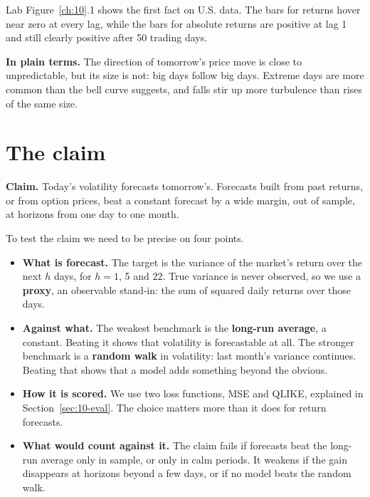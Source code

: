 Lab Figure~\ref{ch:10}.1 shows the first fact on U.S. data. The bars for returns hover near zero at every lag, while the bars for absolute returns are positive at lag 1 and still clearly positive after 50 trading days.

\noindent\textbf{In plain terms.} The direction of tomorrow's price move is close to unpredictable, but its size is not: big days follow big days. Extreme days are more common than the bell curve suggests, and falls stir up more turbulence than rises of the same size.

\section{The claim}
\label{sec:10-claim}

\begin{callout}
\textbf{Claim.} Today's volatility forecasts tomorrow's. Forecasts built from past returns, or from option prices, beat a constant forecast by a wide margin, out of sample, at horizons from one day to one month.
\end{callout}

To test the claim we need to be precise on four points.

\begin{itemize}
  \item \textbf{What is forecast.} The target is the variance of the market's return over the next $h$ days, for $h = 1$, 5 and 22. True variance is never observed, so we use a \textbf{proxy}, an observable stand-in: the sum of squared daily returns over those days.
  \item \textbf{Against what.} The weakest benchmark is the \textbf{long-run average}, a constant. Beating it shows that volatility is forecastable at all. The stronger benchmark is a \textbf{random walk} in volatility: last month's variance continues. Beating that shows that a model adds something beyond the obvious.
  \item \textbf{How it is scored.} We use two loss functions, MSE and QLIKE, explained in Section~\ref{sec:10-eval}. The choice matters more than it does for return forecasts.
  \item \textbf{What would count against it.} The claim fails if forecasts beat the long-run average only in sample, or only in calm periods. It weakens if the gain disappears at horizons beyond a few days, or if no model beats the random walk.
\end{itemize}

